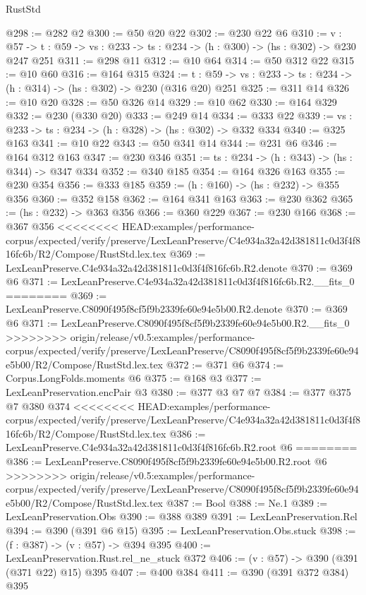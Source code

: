 \begin{lexlean}{RustStd}
\begin{coremodule}
{\begin{coremodule}
@298 := @282 @2
@300 := @50 @20 @22
@302 := @230 @22 @6
@310 := {v : @57} ->
  {t : @59} -> {vs : @233} -> {ts : @234} -> (h : @300) -> (hs : @302) -> @230 @247 @251
@311 := @298 @11
@312 := @10 @64
@314 := @50 @312 @22
@315 := @10 @60
@316 := @164 @315
@324 := {t : @59} -> {vs : @233} -> {ts : @234} -> (h : @314) -> (hs : @302) -> @230 (@316 @20) @251
@325 := @311 @14
@326 := @10 @20
@328 := @50 @326 @14
@329 := @10 @62
@330 := @164 @329
@332 := @230 (@330 @20)
@333 := @249 @14
@334 := @333 @22
@339 := {vs : @233} -> {ts : @234} -> (h : @328) -> (hs : @302) -> @332 @334
@340 := @325 @163
@341 := @10 @22
@343 := @50 @341 @14
@344 := @231 @6
@346 := @164 @312 @163
@347 := @230 @346
@351 := {ts : @234} -> (h : @343) -> (hs : @344) -> @347 @334
@352 := @340 @185
@354 := @164 @326 @163
@355 := @230 @354
@356 := @333 @185
@359 := (h : @160) -> (hs : @232) -> @355 @356
@360 := @352 @158
@362 := @164 @341 @163
@363 := @230 @362
@365 := (hs : @232) -> @363 @356
@366 := @360 @229
@367 := @230 @166
@368 := @367 @356
<<<<<<<< HEAD:examples/performance-corpus/expected/verify/preserve/LexLeanPreserve/C4e934a32a42d381811c0d3f4f816fc6b/R2/Compose/RustStd.lex.tex
@369 := LexLeanPreserve.C4e934a32a42d381811c0d3f4f816fc6b.R2.denote
@370 := @369 @6
@371 := LexLeanPreserve.C4e934a32a42d381811c0d3f4f816fc6b.R2.__fits_0
========
@369 := LexLeanPreserve.C8090f495f8cf5f9b2339fe60e94e5b00.R2.denote
@370 := @369 @6
@371 := LexLeanPreserve.C8090f495f8cf5f9b2339fe60e94e5b00.R2.__fits_0
>>>>>>>> origin/release/v0.5:examples/performance-corpus/expected/verify/preserve/LexLeanPreserve/C8090f495f8cf5f9b2339fe60e94e5b00/R2/Compose/RustStd.lex.tex
@372 := @371 @6
@374 := Corpus.LongFolds.moments @6
@375 := @168 @3
@377 := LexLeanPreservation.encPair @3
@380 := @377 @3 @7 @7
@384 := @377 @375 @7 @380 @374
<<<<<<<< HEAD:examples/performance-corpus/expected/verify/preserve/LexLeanPreserve/C4e934a32a42d381811c0d3f4f816fc6b/R2/Compose/RustStd.lex.tex
@386 := LexLeanPreserve.C4e934a32a42d381811c0d3f4f816fc6b.R2.root @6
========
@386 := LexLeanPreserve.C8090f495f8cf5f9b2339fe60e94e5b00.R2.root @6
>>>>>>>> origin/release/v0.5:examples/performance-corpus/expected/verify/preserve/LexLeanPreserve/C8090f495f8cf5f9b2339fe60e94e5b00/R2/Compose/RustStd.lex.tex
@387 := Bool
@388 := Ne.{1}
@389 := LexLeanPreservation.Obs
@390 := @388 @389
@391 := LexLeanPreservation.Rel
@394 := @390 (@391 @6 @15)
@395 := LexLeanPreservation.Obs.stuck
@398 := (f : @387) -> (v : @57) -> @394 @395
@400 := LexLeanPreservation.Rust.rel_ne_stuck @372
@406 := (v : @57) -> @390 (@391 (@371 @22) @15) @395
@407 := @400 @384
@411 := @390 (@391 @372 @384) @395

\end{coremodule}}
\end{coremodule}
\end{lexlean}
